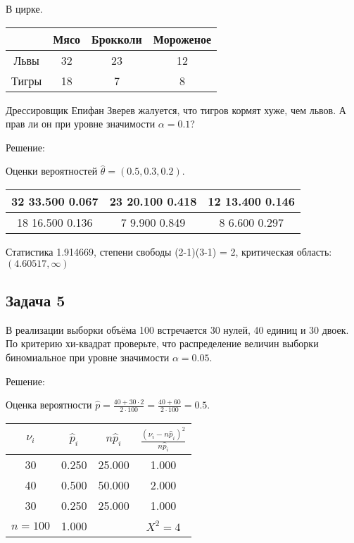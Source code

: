 \documentclass[a4paper,12pt]{article}
\begin{document}
В цирке.

\begin{tabular}{|c|c|c|c|}
    \hline
          & Мясо & Брокколи & Мороженое \\
    \hline
    Львы  & 32   & 23       & 12        \\
    \hline
    Тигры & 18   & 7        & 8         \\
    \hline
\end{tabular}

Дрессировщик Епифан Зверев жалуется, что тигров кормят хуже, чем львов. А прав ли он при уровне значимости $\alpha = 0.1$?

Решение:

Оценки вероятностей $\widehat{\theta} = (0.5, 0.3, 0.2)$.

\begin{tabular}{|c|c|c|}
    \hline
    32    33.500     0.067 & 23    20.100     0.418 & 12    13.400     0.146 \\
    \hline
    18    16.500     0.136 & 7     9.900     0.849  & 8     6.600     0.297  \\
    \hline
\end{tabular}

Статистика 1.914669, степени свободы (2-1)(3-1) = 2, критическая область: $(4.60517, \infty)$

\subsection*{Задача 5}

В реализации выборки объёма 100 встречается 30 нулей, 40 единиц и 30 двоек. По критерию хи-квадрат проверьте, что распределение величин выборки
биномиальное при уровне значимости $\alpha = 0.05$.

Решение:

Оценка вероятности $\widehat{p} = \frac{40 + 30 \cdot 2}{2 \cdot 100} = \frac{40 + 60}{2 \cdot 100} = 0.5$.

\begin{tabular}{|c|c|c|c|}
    \hline
    $\nu_i$   & $\widehat{p}_i$ & $n \widehat{p}_i$ & $\frac{(\nu_i - n \widehat{p}_i)^2}{n \widehat{p}_i}$ \\
    \hline
    30        & 0.250           & 25.000            & 1.000                                                 \\
    40        & 0.500           & 50.000            & 2.000                                                 \\
    30        & 0.250           & 25.000            & 1.000                                                 \\
    \hline
    $n = 100$ & 1.000           &                   & $X^2 = 4$                                             \\
    \hline
\end{tabular}
\end{document}
